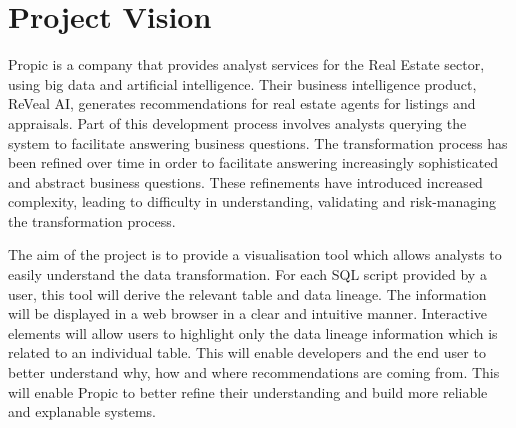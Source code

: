 \section{Project Vision}
\begin{spacing}{1.3}
Propic is a company that provides analyst services for the Real Estate sector, using big data and artificial intelligence. Their business intelligence product, ReVeal AI, generates recommendations for real estate agents for listings and appraisals. Part of this development process involves analysts querying the system to facilitate answering business questions. The transformation process has been refined over time in order to facilitate answering increasingly sophisticated and abstract business questions. These refinements have introduced increased complexity, leading to difficulty in understanding, validating and risk-managing the transformation process. 

The aim of the project is to provide a visualisation tool which allows analysts to easily understand the data transformation. For each SQL script provided by a user, this tool will derive the relevant table and data lineage. The information will be displayed in a web browser in a clear and intuitive manner. Interactive elements will allow users to highlight only the data lineage information which is related to an individual table. This will enable developers and the end user to better understand why, how and where recommendations are coming from. This will enable Propic to better refine their understanding and build more reliable and explanable systems.
\end{spacing}
